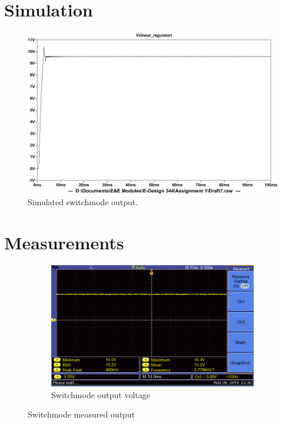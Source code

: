 \section{Simulation} \label{sec:simulation_switchmode}
\begin{figure}[h] 
 \centering
  	\includegraphics[width=0.6\linewidth]{./Figures/switchmode_simulate.pdf}
  	\caption{Simulated switchmode output.}
  	\label{fig:switchmode_simulation}
 \end{figure}
 
 
\section{Measurements} \label{sec:measurements_switchmode}
\begin{figure}[h]
 \centering
 
    \begin{subfigure}[]{0.5\linewidth}
        \centering
        \includegraphics[width=1.\linewidth,]{./Figures/switchmode_test}
        \caption{Switchmode output voltage}
        \label{fig:5v_output_measurement}
    \end{subfigure}
    
\caption{Switchmode measured output}
\label{fig:switchmode_measurement_box}
\end{figure}








